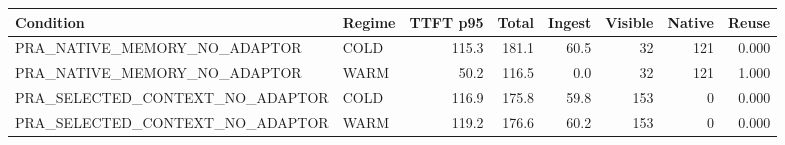 \begin{tabular}{llrrrrrr}
\toprule
Condition & Regime & TTFT p95 & Total & Ingest & Visible & Native & Reuse \\
\midrule
PRA\_NATIVE\_MEMORY\_NO\_ADAPTOR & COLD & 115.3 & 181.1 & 60.5 & 32 & 121 & 0.000 \\
PRA\_NATIVE\_MEMORY\_NO\_ADAPTOR & WARM & 50.2 & 116.5 & 0.0 & 32 & 121 & 1.000 \\
PRA\_SELECTED\_CONTEXT\_NO\_ADAPTOR & COLD & 116.9 & 175.8 & 59.8 & 153 & 0 & 0.000 \\
PRA\_SELECTED\_CONTEXT\_NO\_ADAPTOR & WARM & 119.2 & 176.6 & 60.2 & 153 & 0 & 0.000 \\
\bottomrule
\end{tabular}
